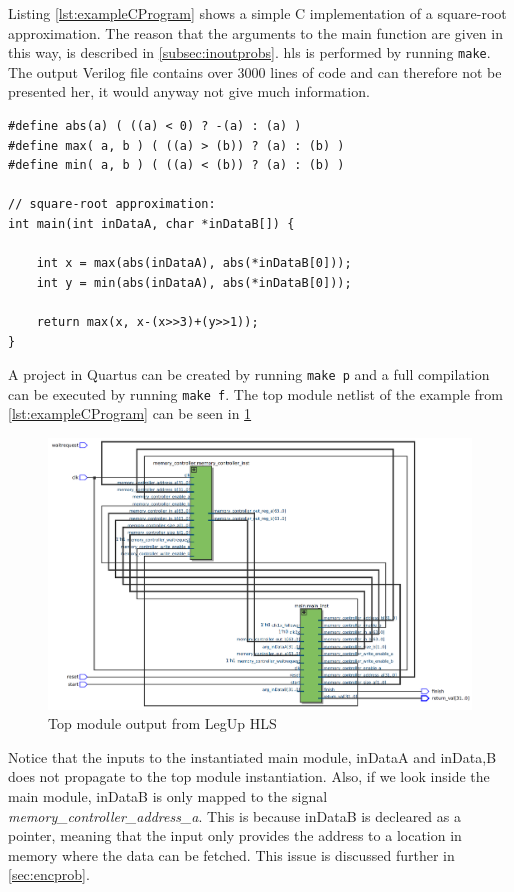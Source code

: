 \noindent
Listing \ref{lst:exampleCProgram} shows a simple C implementation of a square-root approximation. The reason that the arguments to the main function are given in this way, is described in \cref{subsec:inoutprobs}. \gls{hls} is performed by running \verb!make!. The output Verilog file contains over 3000 lines of code and can therefore not be presented her, it would anyway not give much information.
\begin{lstlisting}[caption={Useless code},label=lst:exampleCProgram]
#define abs(a) ( ((a) < 0) ? -(a) : (a) )
#define max( a, b ) ( ((a) > (b)) ? (a) : (b) )
#define min( a, b ) ( ((a) < (b)) ? (a) : (b) )

// square-root approximation:
int main(int inDataA, char *inDataB[]) {

    int x = max(abs(inDataA), abs(*inDataB[0]));
    int y = min(abs(inDataA), abs(*inDataB[0]));

    return max(x, x-(x>>3)+(y>>1));
}
\end{lstlisting}

A project in Quartus can be created by running \verb!make p! and a full compilation can be executed by running \verb!make f!. The top module netlist of the example from \cref{lst:exampleCProgram} can be seen in \cref{fig:legupouttop}
\begin{figure}[hbpt]
\centering
\includegraphics[width=\textwidth]{../figs/LegUpOutputTop.png}
\caption{\label{fig:legupouttop}Top module output from LegUp HLS}
\end{figure}
Notice that the inputs to the instantiated main module, inDataA and inData,B does not propagate to the top module instantiation. Also, if we look inside the main module, inDataB is only mapped to the signal \textit{memory\_controller\_address\_a}. This is because inDataB is decleared as a pointer, meaning that the input only provides the address to a location in memory where the data can be fetched. This issue is discussed further in \cref{sec:encprob}.

